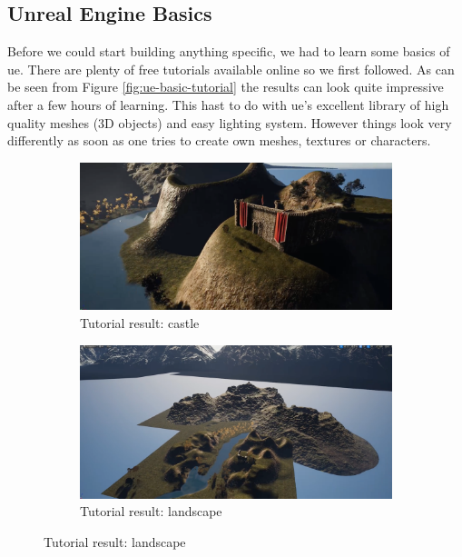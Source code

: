 \documentclass[
  a4paper,  %
  twoside,  %
  bibliography=totoc,
  headsepline,
  cleardoublepage=empty,
  parskip=half,
  draft=false
]{scrbook}
\begin{document}
\subsection*{Unreal Engine Basics}
Before we could start building anything specific, we had to learn some basics of \gls{ue}. There are plenty of free tutorials available online so we first followed. As can be seen from Figure \ref{fig:ue-basic-tutorial} the results can look quite impressive after a few hours of learning. This hast to do with \gls{ue}'s excellent library of high quality meshes (3D objects) and easy lighting system. However things look very differently as soon as one tries to create own meshes, textures or characters. 

\begin{figure}[h]
  \centering
  \begin{subfigure}{0.45\textwidth}
    \includegraphics[width=\linewidth]{graphics/images/unreal-engine/Basics/Landscape-Castle.png}
    \caption{Tutorial result: castle}
  \end{subfigure}
  \begin{subfigure}{0.45\textwidth}
    \includegraphics[width=\linewidth]{graphics/images/unreal-engine/Basics/Landscape-Overview.png}
    \caption{Tutorial result: landscape}
  \end{subfigure}


\end{figure}
\end{document}
